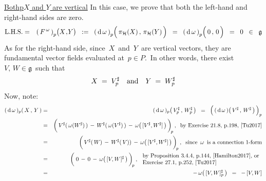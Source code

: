 \vskip 0.2cm
\noindent
\underline{Both{\color{white}p}$X$ and $Y$ are vertical}
\vskip 0.1cm
\noindent
In this case, we prove that both the left-hand and right-hand sides are zero.
\begin{eqnarray*}
\textnormal{L.H.S.}
& = &
	\left(\,F^{\,\omega}\,\right)_{p}\!\left(
		X
		\overset{{\color{white}1}}{,}
		Y
		\right)
\;\; := \;\;
	\left(\,\d\,\omega\,\right)_{p}\!\left(\,
		\overset{{\color{white}.}}{\pi_{\mathcal{H}}(X)}
		\,,\,
		\pi_{\mathcal{H}}(Y)
		\,\right)
\;\; = \;\;
	\left(\,\d\,\omega\,\right)_{p}\!\left(\,
		\overset{{\color{white}.}}{0}
		\,,\,
		0
		\,\right)
\;\; = \;\;
	0
\;\; \in \;\;
	\mathfrak{g}
\end{eqnarray*}
As for the right-hand side, since \,$X$\, and \,$Y$\, are vertical vectors,
they are fundamental vector fields evaluated at \,$p \in P$.\,
In other words, there exist \,$V,\, W \in \mathfrak{g}$\, such that
\begin{equation*}
X \; = \; V^{\sharp}_{p}
\quad
\textnormal{and}
\quad
Y \; = \; W^{\sharp}_{p}
\end{equation*}
Now, note:
\begin{eqnarray*}
(\,\d\,\omega\,)_{p}\!\left(\,X\,,\,Y\,\right)
& = &
	(\,\d\,\omega\,)_{p}\!\left(\,V^{\sharp}_{p}\,,\,W^{\sharp}_{p}\,\right)
\;\; = \;\;
	\left(\,
		(\,\overset{{\color{white}.}}{\d\,\omega}\,)\!\left(\,V^{\sharp}\,,\,W^{\sharp}\,\right)
		\,\right)_{p}
\\
& = &
	\left(\,
		\overset{{\color{white}.}}{V^{\sharp}(\,\omega(W^{\sharp})\,)}
		\,-\,
		W^{\sharp}(\,\omega(V^{\sharp})\,)
		\,-\,
		\omega\!\left(\,[V^{\sharp},W^{\sharp}]\,\right)
		\,\right)_{\!p},
	\;\;
	\textnormal{by Exercise 21.8, p.198, \cite{Tu2017}}
\\
& = &
	\left(\,
		\overset{{\color{white}.}}{V^{\sharp}(\,W)}
		\,-\,
		W^{\sharp}(\,V))
		\,-\,
		\omega\!\left(\,[V^{\sharp},W^{\sharp}]\,\right)
		\,\right)_{\!p},
	\;\;
	\textnormal{since \,$\omega$\, is a connection $1$-form}
\\
& = &
	\left(\;
		\overset{{\color{white}1}}{0}
		\,-\,
		0
		\,-\,
		\omega\!\left(\,[V,W]^{\sharp}\,\right)
		\,\right)_{\!p},
	\;
	\begin{array}{l}
	\textnormal{by Proposition 3.4.4, p.144, \cite{Hamilton2017}, or}
	\\
	\textnormal{Exercise 27.1, p.252, \cite{Tu2017}}
	\end{array}
\\
& = &
	-\, \omega\!\left(\,[V,W]^{\sharp}_{p}\,\right)
\;\; = \;\;
	-\,[V,W]
\end{eqnarray*}
